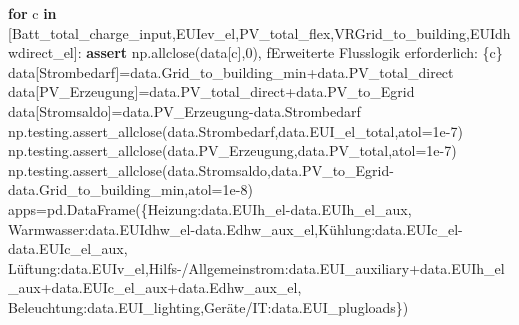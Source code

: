 \documentclass[
  ngerman,
  a4paper,
  DIV=11]{scrreprt}
\newenvironment{Shaded}{\begin{snugshade}}{\end{snugshade}}
\newcommand{\ControlFlowTok}[1]{\textcolor[rgb]{0.00,0.23,0.31}{\textbf{#1}}}
\newcommand{\DecValTok}[1]{\textcolor[rgb]{0.68,0.00,0.00}{#1}}
\newcommand{\FloatTok}[1]{\textcolor[rgb]{0.68,0.00,0.00}{#1}}
\newcommand{\KeywordTok}[1]{\textcolor[rgb]{0.00,0.23,0.31}{\textbf{#1}}}
\newcommand{\NormalTok}[1]{\textcolor[rgb]{0.00,0.23,0.31}{#1}}
\newcommand{\OperatorTok}[1]{\textcolor[rgb]{0.37,0.37,0.37}{#1}}
\newcommand{\SpecialCharTok}[1]{\textcolor[rgb]{0.37,0.37,0.37}{#1}}
\newcommand{\SpecialStringTok}[1]{\textcolor[rgb]{0.13,0.47,0.30}{#1}}
\newcommand{\StringTok}[1]{\textcolor[rgb]{0.13,0.47,0.30}{#1}}
\begin{document}
\begin{Shaded}
\begin{Highlighting}[]
\ControlFlowTok{for}\NormalTok{ c }\KeywordTok{in}\NormalTok{ [}\StringTok{\textquotesingle{}Batt\_total\_charge\_input\textquotesingle{}}\NormalTok{,}\StringTok{\textquotesingle{}EUIev\_el\textquotesingle{}}\NormalTok{,}\StringTok{\textquotesingle{}PV\_total\_flex\textquotesingle{}}\NormalTok{,}\StringTok{\textquotesingle{}VRGrid\_to\_building\textquotesingle{}}\NormalTok{,}\StringTok{\textquotesingle{}EUIdhwdirect\_el\textquotesingle{}}\NormalTok{]:}
    \ControlFlowTok{assert}\NormalTok{ np.allclose(data[c],}\DecValTok{0}\NormalTok{), }\SpecialStringTok{f\textquotesingle{}Erweiterte Flusslogik erforderlich: }\SpecialCharTok{\{}\NormalTok{c}\SpecialCharTok{\}}\SpecialStringTok{\textquotesingle{}}
\NormalTok{data[}\StringTok{\textquotesingle{}Strombedarf\textquotesingle{}}\NormalTok{]}\OperatorTok{=}\NormalTok{data.Grid\_to\_building\_min}\OperatorTok{+}\NormalTok{data.PV\_total\_direct}
\NormalTok{data[}\StringTok{\textquotesingle{}PV\_Erzeugung\textquotesingle{}}\NormalTok{]}\OperatorTok{=}\NormalTok{data.PV\_total\_direct}\OperatorTok{+}\NormalTok{data.PV\_to\_Egrid}
\NormalTok{data[}\StringTok{\textquotesingle{}Stromsaldo\textquotesingle{}}\NormalTok{]}\OperatorTok{=}\NormalTok{data.PV\_Erzeugung}\OperatorTok{{-}}\NormalTok{data.Strombedarf}
\NormalTok{np.testing.assert\_allclose(data.Strombedarf,data.EUI\_el\_total,atol}\OperatorTok{=}\FloatTok{1e{-}7}\NormalTok{)}
\NormalTok{np.testing.assert\_allclose(data.PV\_Erzeugung,data.PV\_total,atol}\OperatorTok{=}\FloatTok{1e{-}7}\NormalTok{)}
\NormalTok{np.testing.assert\_allclose(data.Stromsaldo,data.PV\_to\_Egrid}\OperatorTok{{-}}\NormalTok{data.Grid\_to\_building\_min,atol}\OperatorTok{=}\FloatTok{1e{-}8}\NormalTok{)}
\NormalTok{apps}\OperatorTok{=}\NormalTok{pd.DataFrame(\{}\StringTok{\textquotesingle{}Heizung\textquotesingle{}}\NormalTok{:data.EUIh\_el}\OperatorTok{{-}}\NormalTok{data.EUIh\_el\_aux,}
 \StringTok{\textquotesingle{}Warmwasser\textquotesingle{}}\NormalTok{:data.EUIdhw\_el}\OperatorTok{{-}}\NormalTok{data.Edhw\_aux\_el,}\StringTok{\textquotesingle{}Kühlung\textquotesingle{}}\NormalTok{:data.EUIc\_el}\OperatorTok{{-}}\NormalTok{data.EUIc\_el\_aux,}
 \StringTok{\textquotesingle{}Lüftung\textquotesingle{}}\NormalTok{:data.EUIv\_el,}\StringTok{\textquotesingle{}Hilfs{-}/Allgemeinstrom\textquotesingle{}}\NormalTok{:data.EUI\_auxiliary}\OperatorTok{+}\NormalTok{data.EUIh\_el\_aux}\OperatorTok{+}\NormalTok{data.EUIc\_el\_aux}\OperatorTok{+}\NormalTok{data.Edhw\_aux\_el,}
 \StringTok{\textquotesingle{}Beleuchtung\textquotesingle{}}\NormalTok{:data.EUI\_lighting,}\StringTok{\textquotesingle{}Geräte/IT\textquotesingle{}}\NormalTok{:data.EUI\_plugloads\})}

\end{Highlighting}
\end{Shaded}
\end{document}
